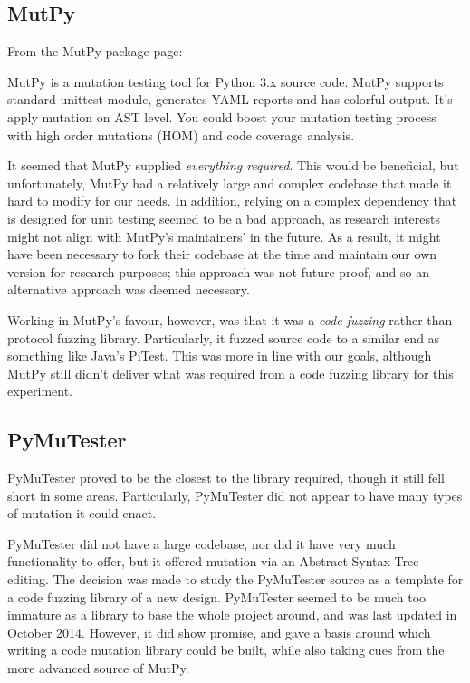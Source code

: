 \subsection{MutPy} %
\label{fuzzing_mutpy}
From the MutPy package page: %
\begin{displayquote}
MutPy is a mutation testing tool for Python 3.x source code. MutPy supports standard unittest module, generates YAML reports and has colorful output. It’s apply mutation on AST level. You could boost your mutation testing process with high order mutations (HOM) and code coverage analysis.
\end{displayquote}\par
It seemed that MutPy supplied \emph{everything required}. This would be beneficial, but unfortunately, MutPy had a relatively large and complex codebase that made it hard to modify for our needs. In addition, relying on a complex dependency that is designed for unit testing seemed to be a bad approach, as research interests might not align with MutPy's maintainers' in the future. As a result, it might have been necessary to fork their codebase at the time and maintain our own version for research purposes; this approach was not future-proof, and so an alternative approach was deemed necessary. \par
Working in MutPy's favour, however, was that it was a \emph{code fuzzing} rather than protocol fuzzing library. Particularly, it fuzzed source code to a similar end as something like Java's PiTest. This was more in line with our goals, although MutPy still didn't deliver what was required from a code fuzzing library for this experiment. \par%

\subsection{PyMuTester}
\label{fuzzing_pymutester}
PyMuTester proved to be the closest to the library required, though it still fell short in some areas. Particularly, PyMuTester did not appear to have many types of mutation it could enact. \par
PyMuTester did not have a large codebase, nor did it have very much functionality to offer, but it offered mutation via an Abstract Syntax Tree editing. The decision was made to study the PyMuTester source as a template for a code fuzzing library of a new design. PyMuTester seemed to be much too immature as a library to base the whole project around, and was last updated in October 2014. However, it did show promise, and gave a basis around which writing a code mutation library could be built, while also taking cues from the more advanced source of MutPy.  \par%


